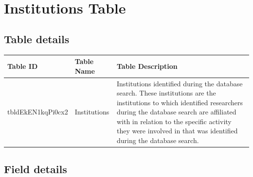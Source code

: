 \documentclass[
]{book}
\begin{document}
\hypertarget{institutions-table}{%
\section{Institutions Table}\label{institutions-table}}

\hypertarget{table-details-5}{%
\subsection{Table details}\label{table-details-5}}

\begin{table}
\centering
\begin{tabular}{l|l|l}
\hline
\textbf{Table ID} & \textbf{Table Name} & \textbf{Table Description}\\
\hline
tbldEkEN1kqPi0cx2 & Institutions & Institutions identified during the database search. These institutions are the institutions to which identified researchers during the database search are affiliated with in relation to the specific activity they were involved in that was identified during the database search.\\
\hline
\end{tabular}
\end{table}

\hypertarget{field-details-2}{%
\subsection{Field details}\label{field-details-2}}
\end{document}
